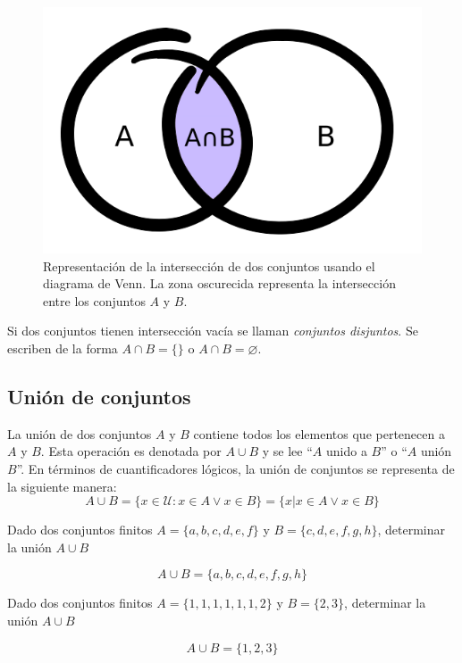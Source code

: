 \begin{center}
	\begin{figure}[ht!]
	\centering
    		\includegraphics[scale=0.5]{FiguresBM/interseccion.png}
    		\caption[Representación de la intersección de dos conjuntos]{Representación de la intersección de dos conjuntos usando el diagrama de Venn. La zona oscurecida representa la intersección entre los conjuntos $A$ y $B$.}
	\end{figure}
\end{center}
Si dos conjuntos tienen intersección vacía se llaman \textit{conjuntos disjuntos}. Se escriben de la forma $A\cap B=\{\}$ o $A\cap B=\varnothing$.
\subsection{Unión de conjuntos}
La unión de dos conjuntos $A$ y $B$ contiene todos los elementos que pertenecen a $A$ y $B$. Esta operación es denotada por $A\cup B$ y se lee ``$A$ unido a $B$'' o ``$A$ unión $B$''. En términos de cuantificadores lógicos, la unión de conjuntos se representa de la siguiente manera:
\begin{equation}
A\cup B=\{x\in\mathcal{U}:x\in A\vee x\in B\}=\{x|x\in A\vee x\in B\}
\end{equation}
\begin{myexample}
Dado dos conjuntos finitos $A=\{a,b,c,d,e,f\}$ y $B=\{c,d,e,f,g,h\}$, determinar la unión $A\cup B$
\end{myexample}
\begin{equation*}
A\cup B=\{a,b,c,d,e,f,g,h\}
\end{equation*}
\begin{myexample}
Dado dos conjuntos finitos $A=\{1,1,1,1,1,1,2\}$ y $B=\{2,3\}$, determinar la unión $A\cup B$
\end{myexample}
\begin{equation*}
A\cup B=\{1,2,3\}
\end{equation*}

